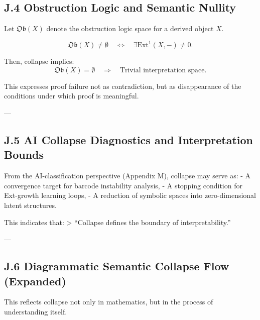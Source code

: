 \documentclass[11pt]{article}
\begin{document}
\begin{axiom}
\begin{axiom}
\subsection*{J.4 Obstruction Logic and Semantic Nullity}

Let $\mathfrak{Ob}(X)$ denote the obstruction logic space for a derived object $X$.

\[
\mathfrak{Ob}(X) \neq \emptyset \quad \Longleftrightarrow \quad \exists \mathrm{Ext}^1(X, -) \neq 0.
\]

Then, collapse implies:
\[
\mathfrak{Ob}(X) = \emptyset \quad \Rightarrow \quad \text{Trivial interpretation space}.
\]

This expresses proof failure not as contradiction, but as disappearance of the conditions under which proof is meaningful.

---

\subsection*{J.5 AI Collapse Diagnostics and Interpretation Bounds}

From the AI-classification perspective (Appendix M), collapse may serve as:
- A convergence target for barcode instability analysis,
- A stopping condition for Ext-growth learning loops,
- A reduction of symbolic spaces into zero-dimensional latent structures.

This indicates that:
> “Collapse defines the boundary of interpretability.”

---

\subsection*{J.6 Diagrammatic Semantic Collapse Flow (Expanded)}

\begin{center}
\end{center}

This reflects collapse not only in mathematics, but in the process of understanding itself.


\end{axiom}
\end{axiom}
\end{document}
